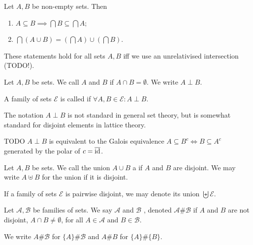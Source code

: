 \begin{proposition}
Let $A, B$ be non-empty sets. Then
\begin{enumerate}
\item $A \subseteq B \implies \bigcap B\subseteq \bigcap A$;
\item $\bigcap(A\cup B) = (\bigcap A)\cup (\bigcap B)$.
\end{enumerate}
These statements hold for all sets $A,B$ iff we use an unrelativised intersection (TODO!).
\end{proposition}

\begin{definition}
Let $A,B$ be sets. We call $A$ and $B$  if $A\cap B = \emptyset$. We write $A\perp B$.

A family of sets $\mathcal{E}$ is called  if $\forall A,B\in\mathcal{E}: A\perp B$.
\end{definition}
The notation $A\perp B$ is not standard in general set theory, but is somewhat standard for disjoint elements in lattice theory.

TODO $A\perp B$ is equivalent to the Galois equivalence $A\subseteq B^c \iff B\subseteq A^c$ generated by the polar of $c= \overline{\operatorname{id}}$.

\begin{definition}
Let $A,B$ be sets. We call the union $A\cup B$ a  if $A$ and $B$ are disjoint. We may write $A\uplus B$ for the union if it is disjoint.

If a family of sets $\mathcal{E}$ is pairwise disjoint, we may denote its union $\biguplus \mathcal{E}$.
\end{definition}

\begin{definition}
Let $\mathcal{A},\mathcal{B}$ be families of sets. We say $\mathcal{A}$ and $\mathcal{B}$ , denoted $\mathcal{A} \# \mathcal{B}$ if $A$ and $B$ are not disjoint, $A\cap B \neq \emptyset$, for all $A\in \mathcal{A}$ and $B\in\mathcal{B}$.

We write $A \# \mathcal{B}$ for $\{A\}\# \mathcal{B}$ and $A\# B$ for $\{A\}\#\{B\}$.
\end{definition}

